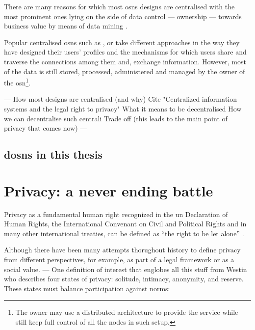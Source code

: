 \documentclass[showtrims]{kthesis}
\begin{document}
There are many reasons for which most \acp{osn} designs are centralised with the 
most prominent ones lying on the side of data control --- ownership --- 
towards business value by means of data mining \cite{DomingosR01}.

Popular centralised \acp{osn} such as \Facebook, \Twitter or \GooglePlus take different 
approaches in the way they have designed their users' profiles and the mechanisms 
for which users share and traverse the connections among them and, exchange information. 
However, most of the data is still stored, processed, administered and managed by 
the owner of the \ac{osn}\footnote{The owner may use a distributed architecture 
to provide the service while still keep full control of all the nodes in such setup.}.




---
How most designs are centralised (and why)
Cite "Centralized information systems and the legal right to privacy"
What it means to be decentralised
How we can decentralise such centrali
Trade off (this leads to the main point of privacy that comes now)
---

\subsection{\aclp{dosn} in this thesis}


\section{Privacy: a never ending battle}
Privacy as a fundamental human right recognized in the \ac{un} Declaration of Human 
Rights, the International Convenant on Civil and Political Rights and in many other 
international treaties, can be defined as ``the right to be let alone'' \cite{The Right to Privacy (article)
}.

Although there have been many attempts thorughout history to define privacy from different
perspectives, for example, as part of a legal framework or as a social value.
---
One definition of interest that englobes all this stuff from Westin who describes 
four states of privacy: solitude, intimacy, anonymity, and reserve. These states must balance participation against norms:

\end{document}
